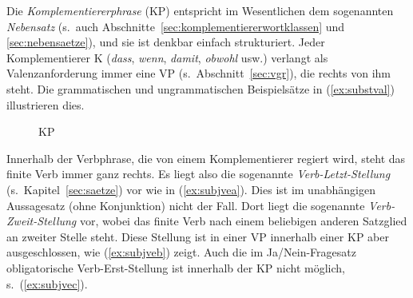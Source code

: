 Die \textit{Komplementiererphrase} (KP) entspricht im Wesentlichen dem sogenannten \textit{Nebensatz} (s.\ auch Abschnitte~\ref{sec:komplementiererwortklassen} und \ref{sec:nebensaetze}), und sie ist denkbar einfach strukturiert.
Jeder Komplementierer K (\textit{dass}, \textit{wenn}, \textit{damit}, \textit{obwohl} usw.) verlangt als Valenzanforderung immer eine VP (s.\ Abschnitt~\ref{sec:vgr}), die rechts von ihm steht.
Die grammatischen und ungrammatischen Beispielsätze in (\ref{ex:substval}) illustrieren dies.

\begin{exe}
  \ex\label{ex:substval}
  \begin{xlist}
  \end{xlist}
\end{exe}

\begin{figure}[!htbp]
  \centering
  \caption{KP}
  \label{fig:substval}
\end{figure}


Innerhalb der Verbphrase, die von einem Komplementierer regiert wird, steht das finite Verb immer ganz rechts.
Es liegt also die sogenannte \textit{Verb-Letzt-Stellung} (s.\ Kapitel~\ref{sec:saetze}) vor wie in (\ref{ex:subjvea}).
Dies ist im unabhängigen Aussagesatz (ohne Konjunktion) nicht der Fall.
Dort liegt die sogenannte \textit{Verb-Zweit-Stellung} vor, wobei das finite Verb nach einem beliebigen anderen Satzglied an zweiter Stelle steht.
Diese Stellung ist in einer VP innerhalb einer KP aber ausgeschlossen, wie (\ref{ex:subjveb}) zeigt.
Auch die im Ja\slash Nein-Fragesatz obligatorische Verb-Erst-Stellung ist innerhalb der KP nicht möglich, s.\ (\ref{ex:subjvec}).

\begin{exe}
  \ex\label{ex:subjve}
  \begin{xlist}
  \end{xlist}
\end{exe}

